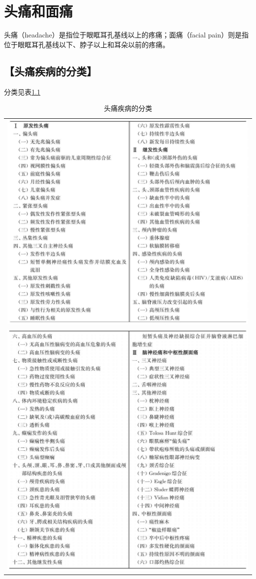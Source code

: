 \chapter{头痛和面痛}

头痛（headache）是指位于眼眶耳孔基线以上的疼痛；面痛（facial
pain）则是指位于眼眶耳孔基线以下、脖子以上和耳朵以前的疼痛。

\section{【头痛疾病的分类】}

分类见表\ref{tab46-1}

\begin{longtable}{c}
 \caption{头痛疾病的分类}
 \label{tab46-1}
 \endfirsthead
 \caption[]{头痛疾病的分类}
 \endhead
 \includegraphics[width=\textwidth,height=\textheight,keepaspectratio]{./images/Image00275.jpg}\\
 \includegraphics[width=\textwidth,height=\textheight,keepaspectratio]{./images/Image00276.jpg}

\end{longtable}

